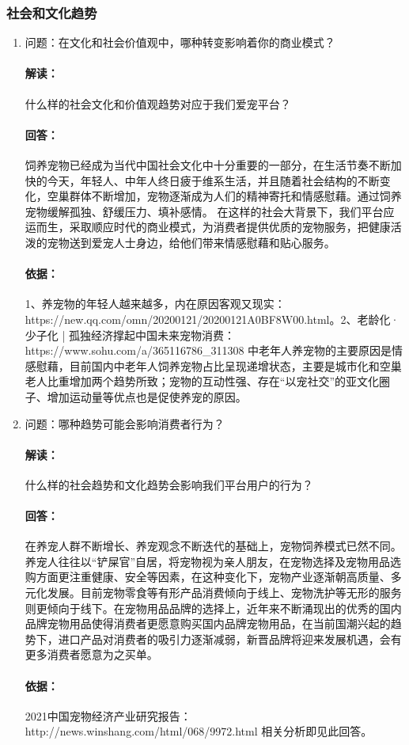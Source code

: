 \documentclass[a4paper]{ctexart}
\begin{document}
\subsubsection{社会和文化趋势}
\begin{enumerate}[label=\alph*.]
  \item 问题：在文化和社会价值观中，哪种转变影响着你的商业模式？
  \paragraph{解读：}什么样的社会文化和价值观趋势对应于我们爱宠平台？
  \paragraph{回答：}饲养宠物已经成为当代中国社会文化中十分重要的一部分，在生活节奏不断加快的今天，年轻人、中年人终日疲于维系生活，并且随着社会结构的不断变化，空巢群体不断增加，宠物逐渐成为人们的精神寄托和情感慰藉。通过饲养宠物缓解孤独、舒缓压力、填补感情。
  在这样的社会大背景下，我们平台应运而生，采取顺应时代的商业模式，为消费者提供优质的宠物服务，把健康活泼的宠物送到爱宠人士身边，给他们带来情感慰藉和贴心服务。
  \paragraph{依据：}1、养宠物的年轻人越来越多，内在原因客观又现实：\\https://new.qq.com/omn/20200121/20200121A0BF8W00.html。2、老龄化·少子化 | 孤独经济撑起中国未来宠物消费：https://www.sohu.com/a/365116786\_311308
  中老年人养宠物的主要原因是情感慰藉，目前国内中老年人饲养宠物占比呈现递增状态，主要是城市化和空巢老人比重增加两个趋势所致；宠物的互动性强、存在“以宠社交”的亚文化圈子、增加运动量等优点也是促使养宠的原因。
  \item 问题：哪种趋势可能会影响消费者行为？
  \paragraph{解读：}什么样的社会趋势和文化趋势会影响我们平台用户的行为？
  \paragraph{回答：}在养宠人群不断增长、养宠观念不断迭代的基础上，宠物饲养模式已然不同。养宠人往往以“铲屎官”自居，将宠物视为亲人朋友，在宠物选择及宠物用品选购方面更注重健康、安全等因素，在这种变化下，宠物产业逐渐朝高质量、多元化发展。目前宠物零食等有形产品消费倾向于线上、宠物洗护等无形的服务则更倾向于线下。在宠物用品品牌的选择上，近年来不断涌现出的优秀的国内品牌宠物用品使得消费者更愿意购买国内品牌宠物用品，在当前国潮兴起的趋势下，进口产品对消费者的吸引力逐渐减弱，新晋品牌将迎来发展机遇，会有更多消费者愿意为之买单。
  \paragraph{依据：}2021中国宠物经济产业研究报告：\\http://news.winshang.com/html/068/9972.html
  相关分析即见此回答。
\end{enumerate}
\end{document}
